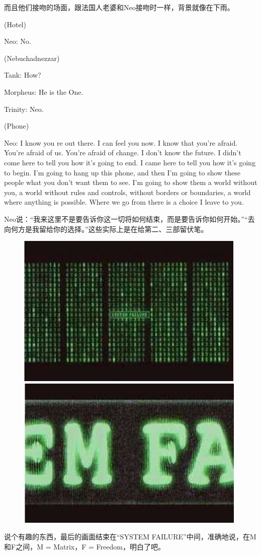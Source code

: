 \documentclass{ctexart}
\newenvironment{myquote}{\color{green} \setlength{\leftskip}{6em} \setlength{\rightskip}{4em} \setlength{\parindent}{-2em}}{\par}
\begin{document}
而且他们接吻的场面，跟法国人老婆和Neo接吻时一样，背景就像在下雨。

\begin{myquote}
(Hotel)

Neo: No.

(Nebuchadnezzar)

Tank: How?

Morpheus: He is the One.

Trinity: Neo.

(Phone)

Neo: I know you re out there. I can feel you now. I know that you're afraid. You're afraid of us. You're afraid of change. I don't know the future. I didn't come here to tell you how it's going to end. I came here to tell you how it's going to begin. I'm going to hang up this phone, and then I'm going to show these people what you don't want them to see. I'm going to show them a world without you, a world without rules and controls, without borders or boundaries, a world where anything is possible. Where we go from there is a choice I leave to you.
\end{myquote}

Neo说：“我来这里不是要告诉你这一切将如何结束，而是要告诉你如何开始。”“去向何方是我留给你的选择。”这些实际上是在给第二、三部留伏笔。

\newpage

\begin{figure}[htb]
\centering
\includegraphics[width=0.45\linewidth]{fig/read_Matrix-90}
\includegraphics[width=0.45\linewidth]{fig/read_Matrix-91}
\end{figure}

说个有趣的东西，最后的画面结束在“SYSTEM FAILURE”中间，准确地说，在M和F之间，M = Matrix，F = Freedom，明白了吧。
\end{document}
